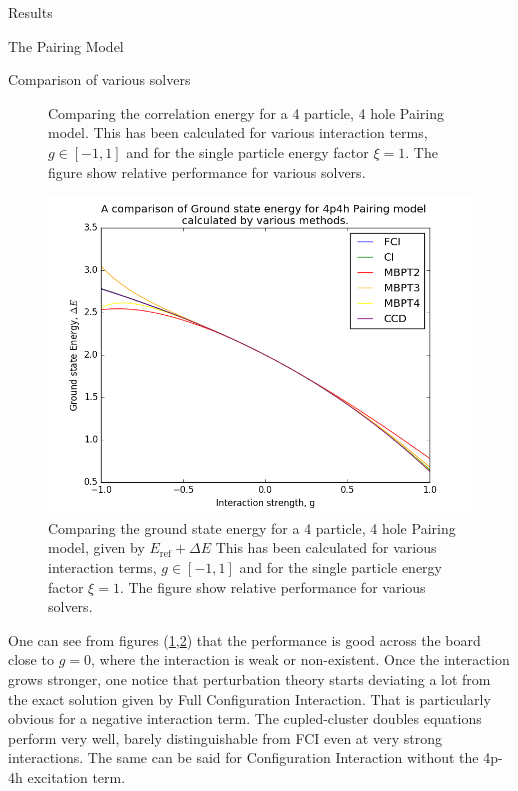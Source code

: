 \documentclass[twoside,english]{uiofysmaster}
\begin{document}
\begin{chapter}{Results}
\begin{section}{The Pairing Model}
\begin{subsection}{Comparison of various solvers}
\begin{figure}[H]
				\caption{Comparing the correlation energy for a 4 particle, 4 hole Pairing model. This has been calculated for various interaction terms, $g \in [-1,1]$ and for the single particle energy factor $\xi = 1$. The figure show relative performance for various solvers.}
				\label{figure:CompareCorrelationPairing}
			\end{figure}

			\begin{figure}[H]
				\includegraphics[width=\linewidth]{../Pairing_Model/Results/Figures/Pairing4p4h_CompareE_AllMethods.png}
				\caption{Comparing the ground state energy for a 4 particle, 4 hole Pairing model, given by $E_{\text{ref}} + \Delta E$ This has been calculated for various interaction terms, $g \in [-1,1]$ and for the single particle energy factor $\xi = 1$. The figure show relative performance for various solvers.}
				\label{figure:CompareEnergyPairing}
			\end{figure}
			One can see from figures (\ref{figure:CompareCorrelationPairing},\ref{figure:CompareEnergyPairing}) that the performance is good across the board close to $g = 0$, where the interaction is weak or non-existent. Once the interaction grows stronger, one notice that perturbation theory starts deviating a lot from the exact solution given by Full Configuration Interaction. That is particularly obvious for a negative interaction term. The cupled-cluster doubles equations perform very well, barely distinguishable from FCI even at very strong interactions. The same can be said for Configuration Interaction without the 4p-4h excitation term.  
		\end{subsection}


\end{section}
\end{chapter}
\end{document}
